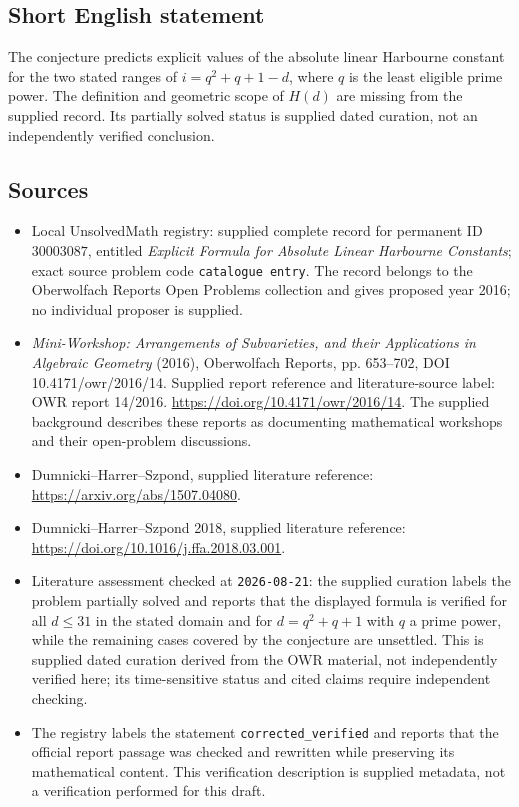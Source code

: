 \documentclass[11pt]{article}
\begin{document}
\subsection{Short English statement}
The conjecture predicts explicit values of the absolute linear Harbourne constant for the two stated ranges of \(i=q^2+q+1-d\), where \(q\) is the least eligible prime power. The definition and geometric scope of \(H(d)\) are missing from the supplied record. Its partially solved status is supplied dated curation, not an independently verified conclusion.
\subsection{Sources}
\begin{itemize}
\item Local UnsolvedMath registry: supplied complete record for permanent ID \(30003087\), entitled \emph{Explicit Formula for Absolute Linear Harbourne Constants}; exact source problem code \texttt{catalogue entry}. The record belongs to the Oberwolfach Reports Open Problems collection and gives proposed year 2016; no individual proposer is supplied.
\item \emph{Mini-Workshop: Arrangements of Subvarieties, and their Applications in Algebraic Geometry} (2016), Oberwolfach Reports, pp. 653--702, DOI 10.4171/owr/2016/14. Supplied report reference and literature-source label: OWR report 14/2016. \url{https://doi.org/10.4171/owr/2016/14}. The supplied background describes these reports as documenting mathematical workshops and their open-problem discussions.
\item Dumnicki--Harrer--Szpond, supplied literature reference: \url{https://arxiv.org/abs/1507.04080}.
\item Dumnicki--Harrer--Szpond 2018, supplied literature reference: \url{https://doi.org/10.1016/j.ffa.2018.03.001}.
\item Literature assessment checked at \texttt{2026-08-21}: the supplied curation labels the problem partially solved and reports that the displayed formula is verified for all \(d\leq31\) in the stated domain and for \(d=q^2+q+1\) with \(q\) a prime power, while the remaining cases covered by the conjecture are unsettled. This is supplied dated curation derived from the OWR material, not independently verified here; its time-sensitive status and cited claims require independent checking.
\item The registry labels the statement \texttt{corrected\_verified} and reports that the official report passage was checked and rewritten while preserving its mathematical content. This verification description is supplied metadata, not a verification performed for this draft.
\end{itemize}
\end{document}
